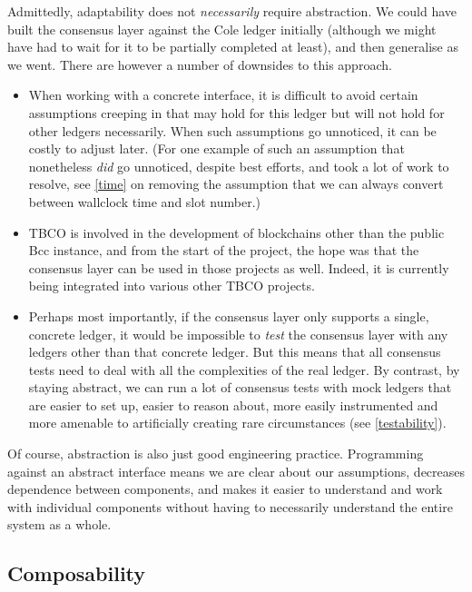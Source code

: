 Admittedly, adaptability does not \emph{necessarily} require abstraction. We
could have built the consensus layer against the Cole ledger initially
(although we might have had to wait for it to be partially completed at least),
and then generalise as we went. There are however a number of downsides to this
approach.

\begin{itemize}
\item When working with a concrete interface, it is difficult to avoid certain
assumptions creeping in that may hold for this ledger but will not hold for
other ledgers necessarily. When such assumptions go unnoticed, it can be costly
to adjust later. (For one example of such an assumption that nonetheless
\emph{did} go unnoticed, despite best efforts, and took a lot of work to
resolve, see \cref{time} on removing the assumption that we can always
convert between wallclock time and slot number.)

\item TBCO is involved in the development of blockchains other than the public
Bcc instance, and from the start of the project, the hope was that the
consensus layer can be used in those projects as well. Indeed, it is currently
being integrated into various other TBCO projects.

\item Perhaps most importantly, if the consensus layer only supports a single,
concrete ledger, it would be impossible to \emph{test} the consensus layer with
any ledgers other than that concrete ledger. But this means that all consensus
tests need to deal with all the complexities of the real ledger. By contrast,
by staying abstract, we can run a lot of consensus tests with mock ledgers that
are easier to set up, easier to reason about, more easily instrumented and more
amenable to artificially creating rare circumstances (see \cref{testability}).
\end{itemize}

Of course, abstraction is also just good engineering practice. Programming
against an abstract interface means we are clear about our assumptions,
decreases dependence between components, and makes it easier to understand and
work with individual components without having to necessarily understand the
entire system as a whole.

\subsection{Composability}
\label{composability}

